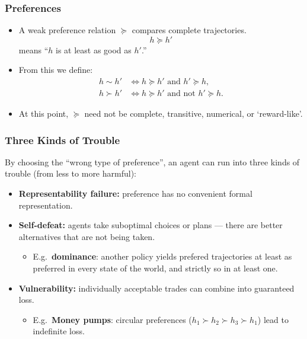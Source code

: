 \documentclass[10pt,a4paper]{beamer}
\newcommand{\pref}{\succcurlyeq}
\newcommand{\strictpref}{\succ}
\newcommand{\indiff}{\sim}
\newcommand{\exitem}{\item[$\triangleright$]}
\begin{document}
\begin{frame}
\frametitle{Preferences}
\begin{itemize}
    \item A weak preference relation $\pref$ compares complete trajectories.
    $$
    h\pref h'
    $$
    means ``$h$ is at least as good as $h'$.''
    \pause
    \item From this we define:
    \begin{align*}
        h \indiff h' &\iff h\pref h'\text{ and }h'\pref h,\\
        h \strictpref h' &\iff h\pref h'\text{ and not }h'\pref h.
    \end{align*}
    \pause
    \item At this point, $\pref$ need not be complete, transitive, numerical,
    or `reward-like'.
\end{itemize}
\end{frame}


\begin{frame}
\frametitle{Three Kinds of Trouble}
By choosing the ``wrong type of preference'', an agent can run into three kinds of trouble (from less to more harmful):
\vspace{0.4cm}
\begin{itemize}
    \item \textbf{Representability failure:}
    preference has no convenient formal representation.
    \pause
    \item \textbf{Self-defeat:}
    agents take suboptimal choices or plans --- there are better alternatives that are not being taken.
    \pause
    \begin{itemize}
        \exitem E.g.\ \textbf{dominance}: another policy yields prefered trajectories at least as preferred in every state of the world, and strictly so in at least one.
    \end{itemize}
    \pause
    \item \textbf{Vulnerability:}
    individually acceptable trades can combine into guaranteed loss.
    \begin{itemize}
        \exitem E.g.\ \textbf{Money pumps}: circular preferences ($h_1\strictpref h_2\strictpref h_3\strictpref h_1$) lead to indefinite loss.
    \end{itemize}
\end{itemize}
\end{frame}
\end{document}
